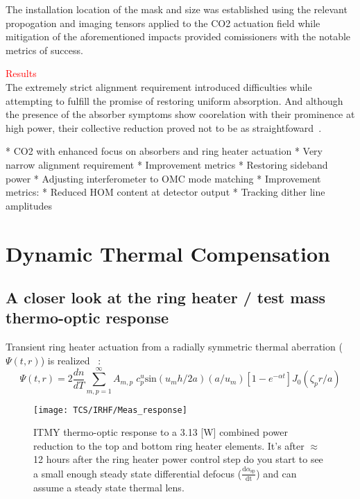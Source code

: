 The installation location of the mask and size was established using the relevant propogation and imaging tensors applied to the CO2 actuation field while mitigation of the aforementioned impacts provided comissioners with the notable metrics of success.

\textcolor{red}{Results}
\\
The extremely strict alignment requirement introduced difficulties while attempting to fulfill the promise of restoring uniform absorption. And although the presence of the absorber symptoms show coorelation with their prominence at high power, their collective reduction proved not to be as straightfoward~\cite{brooks:aigwd2019, buikema:2020}.
	
	* CO2 with enhanced focus on absorbers and ring heater actuation
		* Very narrow alignment requirement
		* Improvement metrics
			* Restoring sideband power	
	* Adjusting interferometer to OMC mode matching
		* Improvement metrics:
			* Reduced HOM content at detector output
			* Tracking dither line amplitudes


\section{Dynamic Thermal Compensation}
\subsection{A closer look at the ring heater / test mass thermo-optic response}
Transient ring heater actuation from a radially symmetric thermal aberration ($\Psi(t,r)$) is realized ~\cite{ramette:2016}:
\begin{equation}
	\Psi(t,r)=2\frac{dn}{dT} \sum^{\infty}_{m,p = 1} A_{m,p} \; c^{u}_{p} \mathrm{sin}(u_m h /2a) (a/u_m)[1-e^{-\alpha t}] J_0(\zeta_p r/a)
\end{equation}

\begin{figure}[H]
     \texttt{[image: TCS/IRHF/Meas\_response]}
     \caption{ITMY thermo-optic response to a 3.13 [W] combined power reduction to the top and bottom ring heater elements. It's after $\approx$ 12 hours after the ring heater power control step do you start to see a small enough steady state differential defocus ($\frac{\mathrm{d} \alpha_\mathrm{sp}}{\mathrm{dt}}$) and can assume a steady state thermal lens.}
     \label{fig:RHresp}
\end{figure}


